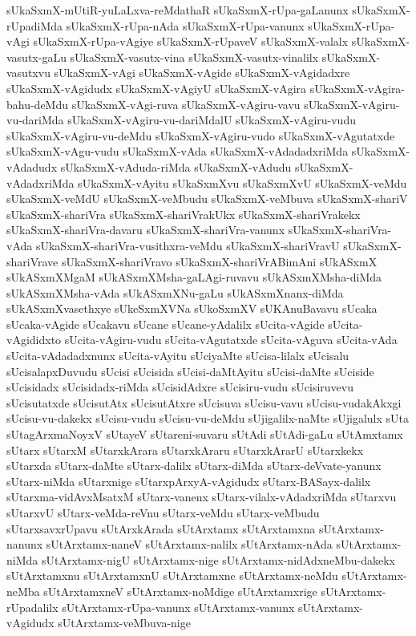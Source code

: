 {sUkaSxmX-mUtiR-yuLaLxva-reMdathaR
sUkaSxmX-rUpa-gaLanunx
sUkaSxmX-rUpadiMda
sUkaSxmX-rUpa-nAda
sUkaSxmX-rUpa-vanunx
sUkaSxmX-rUpa-vAgi
sUkaSxmX-rUpa-vAgiye
sUkaSxmX-rUpaveV
sUkaSxmX-valalx
sUkaSxmX-vasutx-gaLu
sUkaSxmX-vasutx-vina
sUkaSxmX-vasutx-vinalilx
sUkaSxmX-vasutxvu
sUkaSxmX-vAgi
sUkaSxmX-vAgide
sUkaSxmX-vAgidadxre
sUkaSxmX-vAgidudx
sUkaSxmX-vAgiyU
sUkaSxmX-vAgira
sUkaSxmX-vAgira-bahu-deMdu
sUkaSxmX-vAgi-ruva
sUkaSxmX-vAgiru-vavu
sUkaSxmX-vAgiru-vu-dariMda
sUkaSxmX-vAgiru-vu-dariMdalU
sUkaSxmX-vAgiru-vudu
sUkaSxmX-vAgiru-vu-deMdu
sUkaSxmX-vAgiru-vudo
sUkaSxmX-vAgutatxde
sUkaSxmX-vAgu-vudu
sUkaSxmX-vAda
sUkaSxmX-vAdadadxriMda
sUkaSxmX-vAdadudx
sUkaSxmX-vAduda-riMda
sUkaSxmX-vAdudu
sUkaSxmX-vAdadxriMda
sUkaSxmX-vAyitu
sUkaSxmXvu
sUkaSxmXvU
sUkaSxmX-veMdu
sUkaSxmX-veMdU
sUkaSxmX-veMbudu
sUkaSxmX-veMbuva
sUkaSxmX-shariV
sUkaSxmX-shariVra
sUkaSxmX-shariVrakUkx
sUkaSxmX-shariVrakekx
sUkaSxmX-shariVra-davaru
sUkaSxmX-shariVra-vanunx
sUkaSxmX-shariVra-vAda
sUkaSxmX-shariVra-vusithxra-veMdu
sUkaSxmX-shariVravU
sUkaSxmX-shariVrave
sUkaSxmX-shariVravo
sUkaSxmX-shariVrABimAni
sUkASxmX
sUkASxmXMgaM
sUkASxmXMsha-gaLAgi-ruvavu
sUkASxmXMsha-diMda
sUkASxmXMsha-vAda
sUkASxmXNu-gaLu
sUkASxmXnanx-diMda
sUkASxmXvasethxye
sUkeSxmXVNa
sUkoSxmXV
sUKAnuBavavu
sUcaka
sUcaka-vAgide
sUcakavu
sUcane
sUcane-yAdalilx
sUcita-vAgide
sUcita-vAgididxto
sUcita-vAgiru-vudu
sUcita-vAgutatxde
sUcita-vAguva
sUcita-vAda
sUcita-vAdadadxnunx
sUcita-vAyitu
sUciyaMte
sUcisa-lilalx
sUcisalu
sUcisalapxDuvudu
sUcisi
sUcisida
sUcisi-daMtAyitu
sUcisi-daMte
sUciside
sUcisidadx
sUcisidadx-riMda
sUcisidAdxre
sUcisiru-vudu
sUcisiruvevu
sUcisutatxde
sUcisutAtx
sUcisutAtxre
sUcisuva
sUcisu-vavu
sUcisu-vudakAkxgi
sUcisu-vu-dakekx
sUcisu-vudu
sUcisu-vu-deMdu
sUjigalilx-naMte
sUjigalulx
sUta
sUtagArxmaNoyxV
sUtayeV
sUtareni-suvaru
sUtAdi
sUtAdi-gaLu
sUtAmxtamx
sUtarx
sUtarxM
sUtarxkArara
sUtarxkAraru
sUtarxkArarU
sUtarxkekx
sUtarxda
sUtarx-daMte
sUtarx-dalilx
sUtarx-diMda
sUtarx-deVvate-yanunx
sUtarx-niMda
sUtarxnige
sUtarxpArxyA-vAgidudx
sUtarx-BASayx-dalilx
sUtarxma-vidAvxMsatxM
sUtarx-vanenx
sUtarx-vilalx-vAdadxriMda
sUtarxvu
sUtarxvU
sUtarx-veMda-reVnu
sUtarx-veMdu
sUtarx-veMbudu
sUtarxsavxrUpavu
sUtArxkArada
sUtArxtamx
sUtArxtamxna
sUtArxtamx-nanunx
sUtArxtamx-naneV
sUtArxtamx-nalilx
sUtArxtamx-nAda
sUtArxtamx-niMda
sUtArxtamx-nigU
sUtArxtamx-nige
sUtArxtamx-nidAdxneMbu-dakekx
sUtArxtamxnu
sUtArxtamxnU
sUtArxtamxne
sUtArxtamx-neMdu
sUtArxtamx-neMba
sUtArxtamxneV
sUtArxtamx-noMdige
sUtArxtamxrige
sUtArxtamx-rUpadalilx
sUtArxtamx-rUpa-vanunx
sUtArxtamx-vanunx
sUtArxtamx-vAgidudx
sUtArxtamx-veMbuva-nige
}

